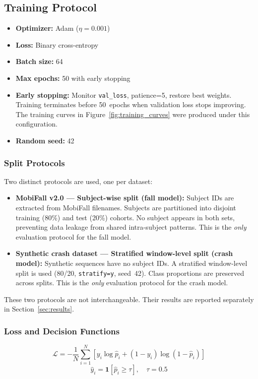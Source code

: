 \documentclass[12pt,a4paper]{article}
\begin{document}
\subsection{Training Protocol}
\label{sec:training}

\begin{itemize}
  \item \textbf{Optimizer:} Adam ($\eta=0.001$)
  \item \textbf{Loss:} Binary cross-entropy
  \item \textbf{Batch size:} 64
  \item \textbf{Max epochs:} 50 with early stopping
  \item \textbf{Early stopping:} Monitor \texttt{val\_loss}, patience=5,
        restore best weights. Training terminates before 50~epochs when
        validation loss stops improving. The training curves in
        Figure~\ref{fig:training_curves} were produced under this configuration.
  \item \textbf{Random seed:} 42
\end{itemize}

\subsubsection*{Split Protocols}

Two distinct protocols are used, one per dataset:
\begin{itemize}
  \item \textbf{MobiFall v2.0 --- Subject-wise split (fall model):}
        Subject IDs are extracted from MobiFall filenames. Subjects are
        partitioned into disjoint training (80\%) and test (20\%) cohorts.
        No subject appears in both sets, preventing data leakage from shared
        intra-subject patterns. This is the \emph{only} evaluation protocol
        for the fall model.
  \item \textbf{Synthetic crash dataset --- Stratified window-level split
        (crash model):} Synthetic sequences have no subject IDs. A stratified
        window-level split is used (80/20, \texttt{stratify=y}, seed~42).
        Class proportions are preserved across splits. This is the \emph{only}
        evaluation protocol for the crash model.
\end{itemize}

These two protocols are not interchangeable. Their results are reported
separately in Section~\ref{sec:results}.

\subsubsection*{Loss and Decision Functions}
\begin{equation}
  \mathcal{L} = -\frac{1}{N}\sum_{i=1}^{N}
  \left[y_i\log\hat{p}_i + (1-y_i)\log(1-\hat{p}_i)\right]
  \label{eq:bce}
\end{equation}
\begin{equation}
  \hat{y}_i=\mathbf{1}\!\left[\hat{p}_i\geq\tau\right],\quad\tau=0.5
  \label{eq:threshold}
\end{equation}
\end{document}
